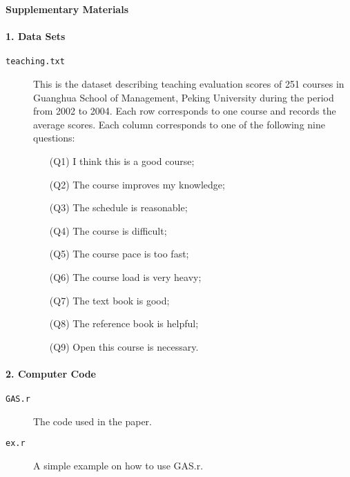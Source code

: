 \documentclass{jcgsf}
\begin{document}
\centerline{\bf\large Supplementary Materials}


\paragraph{1. Data Sets}
\begin{description}
\item[\tt teaching.txt] This is the dataset describing teaching evaluation scores of 251 courses in Guanghua School of Management, Peking University during the period from 2002 to 2004. Each row corresponds to one course and records the average scores. Each column corresponds to one of the following nine questions: 
\begin{itemize}
\item [(Q1)] I think this is a good course;
\item [(Q2)] The course improves my knowledge; 
\item [(Q3)] The schedule is reasonable; 
\item [(Q4)] The course is difficult;
\item [(Q5)] The course pace is too fast; 
\item [(Q6)] The course load is very heavy;
\item [(Q7)] The text book is good; 
\item [(Q8)] The reference book is helpful;
\item [(Q9)] Open this course is necessary.
\end{itemize}
\end{description}

\paragraph{2. Computer Code}
\begin{description}
\item[\tt GAS.r] The code used in the paper.
\item[\tt ex.r] A simple example on how to use GAS.r.
\end{description}
\end{document}
